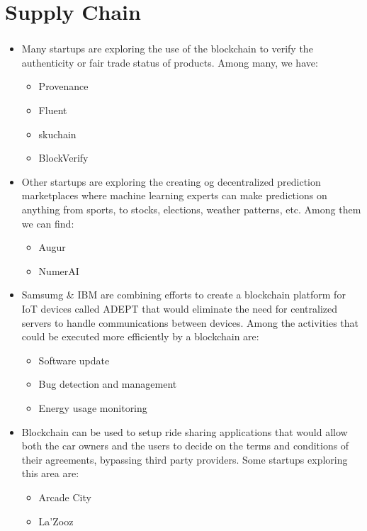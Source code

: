 \documentclass[ 10pt, xcolor = dvipsnames]{beamer}
\begin{document}
\section{Supply Chain}
\begin{frame}[allowframebreaks]
\frametitle{\insertsection}

\begin{itemize}
\item Many startups are exploring the use of the blockchain to verify the authenticity or fair trade status of products. Among many, we have: 
\begin{itemize}
\item Provenance
\item Fluent
\item skuchain
\item BlockVerify
\end{itemize}
\item Other startups are exploring the creating og decentralized prediction marketplaces where machine learning experts can make predictions on anything from sports, to stocks, elections, weather patterns, etc. \linebreak Among them we can find: 
\begin{itemize}
\item Augur
\item NumerAI
\end{itemize}
\framebreak

\item Samsumg \& IBM are combining efforts to create a blockchain platform for IoT devices called ADEPT that would eliminate the need for centralized servers to handle communications between devices. Among the activities \linebreak that could be executed more efficiently by a blockchain are: 
\begin{itemize}
\item Software update
\item Bug detection and management
\item Energy usage monitoring
\end{itemize}
\item Blockchain can be used to setup ride sharing applications that would allow both the car owners and the users to decide on the terms and conditions of their agreements, bypassing third party providers. Some startups exploring this area are: 
\begin{itemize}
\item Arcade City
\item La'Zooz
\end{itemize}

\end{itemize}

\end{frame}
\end{document}
